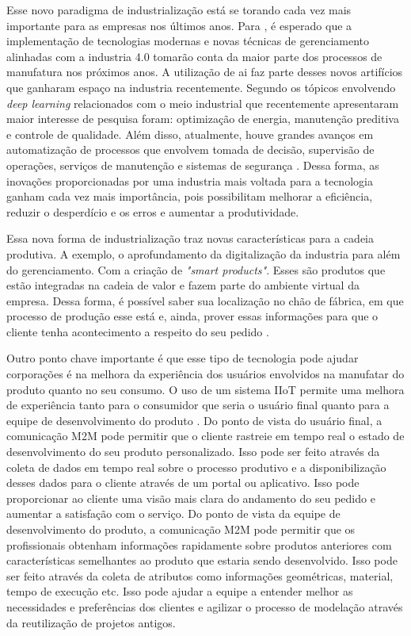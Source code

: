 Esse novo paradigma de industrialização está se torando cada vez mais importante para as empresas nos últimos anos. Para \textcite{Grabowska+2020+90+96}, é esperado que a implementação de tecnologias modernas e novas técnicas de gerenciamento alinhadas com a industria 4.0 tomarão conta da maior parte dos processos de manufatura nos próximos anos. A utilização de \acrshort{ai} faz parte desses novos artifícios que ganharam espaço na industria recentemente. Segundo \textcite{PeresIASmartFactory} os tópicos envolvendo \emph{deep learning} relacionados com o meio industrial que recentemente apresentaram maior interesse de pesquisa foram: optimização de energia, manutenção preditiva e controle de qualidade. Além disso, atualmente, houve grandes avanços em automatização de processos que envolvem tomada de decisão, supervisão de operações, serviços de manutenção e sistemas de segurança \cite{KUMAR2022121284}. Dessa forma, as inovações proporcionadas por uma industria mais voltada para a tecnologia ganham cada vez mais importância, pois possibilitam melhorar a eficiência, reduzir o desperdício e os erros e aumentar a produtividade.

Essa nova forma de industrialização traz novas características para a cadeia produtiva. A exemplo,  o aprofundamento da digitalização da industria para além do gerenciamento. Com a criação de  \emph{"smart products"}. Esses são produtos que estão integradas na cadeia de valor e fazem parte do ambiente virtual da empresa. Dessa forma, é possível saber sua localização no chão de fábrica, em que processo de produção esse está e, ainda, prover essas informações para que o cliente tenha acontecimento a respeito do seu pedido \cite{economies6030046}.

Outro ponto chave importante é que esse tipo de tecnologia pode ajudar corporações é na melhora da experiência dos usuários envolvidos na manufatar do produto quanto no seu consumo.  O uso de um sistema IIoT permite uma melhora de experiência tanto para o consumidor que seria o usuário final quanto para a equipe de desenvolvimento do produto \cite{Grabowska+2020+90+96}. Do ponto de vista do usuário final, a comunicação M2M pode permitir que o cliente rastreie em tempo real o estado de desenvolvimento do seu produto personalizado. Isso pode ser feito através da coleta de dados em tempo real sobre o processo produtivo e a disponibilização desses dados para o cliente através de um portal ou aplicativo. Isso pode proporcionar ao cliente uma visão mais clara do andamento do seu pedido e aumentar a satisfação com o serviço. Do ponto de vista da equipe de desenvolvimento do produto, a comunicação M2M pode permitir que os profissionais obtenham informações rapidamente sobre produtos anteriores com características semelhantes ao produto que estaria sendo desenvolvido. Isso pode ser feito através da coleta de atributos como informações geométricas, material, tempo de execução etc. Isso pode ajudar a equipe a entender melhor as necessidades e preferências dos clientes e agilizar o processo de modelação através da reutilização de projetos antigos.

